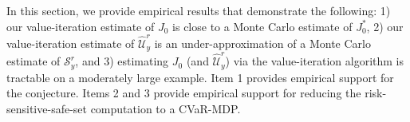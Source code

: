 \documentclass[letterpaper, 10 pt, conference]{ieeeconf}  %
\begin{document}
In this section, we provide empirical results that demonstrate the following: 1) our value-iteration estimate of $J_0$ is close to a Monte Carlo estimate of $J_0^*$,
2) our value-iteration estimate of $\hat{\mathcal{U}}_y^r$ is an under-approximation of a Monte Carlo estimate of $\mathcal{S}_y^r$, and
3) estimating $J_0$ (and $\hat{\mathcal{U}}_y^r$) via the value-iteration algorithm is tractable on a moderately large example.
Item 1 provides empirical support for the conjecture. Items 2 and 3 provide empirical support for 
reducing the risk-sensitive-safe-set computation to a CVaR-MDP.
\end{document}

